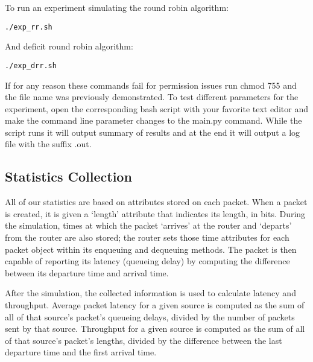 To run an experiment simulating the round robin algorithm:

\begin{lstlisting}
./exp_rr.sh
\end{lstlisting}

And deficit round robin algorithm:

\begin{lstlisting}
./exp_drr.sh
\end{lstlisting}

If for any reason these commands fail for permission issues run chmod 755 and the file name was previously demonstrated. To test different parameters for the experiment, open the corresponding bash script with your favorite text editor and make the command line parameter changes to the main.py command. While the script runs it will output summary of results and at the end it will output a log file with the suffix .out.

\subsection{Statistics Collection}

All of our statistics are based on attributes stored on each packet.
When a packet is created, it is given a `length' attribute that indicates its length, in bits.
During the simulation, times at which the packet `arrives' at the router and `departs' from the router are also stored;
the router sets those time attributes for each packet object within its enqueuing and dequeuing methods.
The packet is then capable of reporting its latency (queueing delay) by computing the difference between its departure time and arrival time.

After the simulation, the collected information is used to calculate latency and throughput.
Average packet latency for a given source is computed as the sum of all of that source's packet's queueing delays, divided by the number of packets sent by that source.
Throughput for a given source is computed as the sum of all of that source's packet's lengths, divided by the difference between the last departure time and the first arrival time.
